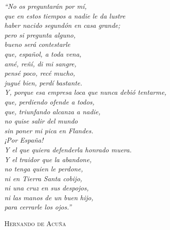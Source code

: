 
\thispagestyle{empty}

\vspace*{4cm}

\begin{flushright}
\itshape
``No os preguntarán por mí,\\
que en estos tiempos a nadie le da lustre\\
haber nacido segundón en casa grande;\\
pero si pregunta alguno,\\
bueno será contestarle\\
que, español, a toda vena,\\
amé, reñí, di mi sangre,\\
pensé poco, recé mucho,\\
jugué bien, perdí bastante.\\[0.7em]

Y, porque esa empresa loca que nunca debió tentarme,\\
que, perdiendo ofende a todos,\\
que, triunfando alcanza a nadie,\\
no quise salir del mundo\\
sin poner mi pica en Flandes.\\[0.7em]

¡Por España!\\[0.7em]

Y el que quiera defenderla honrado muera.\\
Y el traidor que la abandone,\\
no tenga quien le perdone,\\
ni en Tierra Santa cobijo,\\
ni una cruz en sus despojos,\\
ni las manos de un buen hijo,\\
para cerrarle los ojos.''
\end{flushright}

\vspace{1em}
\begin{flushright}
\textsc{Hernando de Acuña}
\end{flushright}

\clearemptydoublepage %


\thispagestyle{empty}


